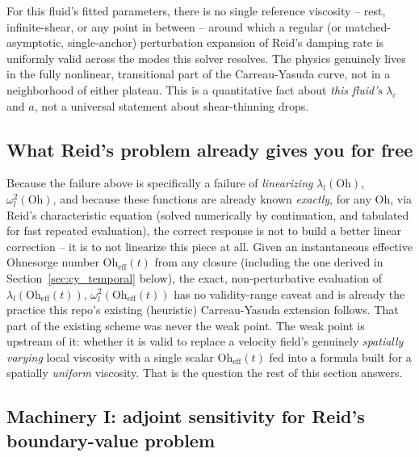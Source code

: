\begin{keybox}
For this fluid's fitted parameters, there is no single reference viscosity
-- rest, infinite-shear, or any point in between -- around which a
regular (or matched-asymptotic, single-anchor) perturbation expansion of
Reid's damping rate is uniformly valid across the modes this solver
resolves. The physics genuinely lives in the fully nonlinear, transitional
part of the Carreau-Yasuda curve, not in a neighborhood of either plateau.
This is a quantitative fact about \emph{this fluid's} $\lambda_c$ and $a$,
not a universal statement about shear-thinning drops.
\end{keybox}

\subsection{What Reid's problem already gives you for free}
\label{sec:cy_exact_evaluation}

Because the failure above is specifically a failure of \emph{linearizing}
$\lambda_l(\mathrm{Oh})$, $\omega_l^2(\mathrm{Oh})$, and because these
functions are already known \emph{exactly}, for any $\mathrm{Oh}$, via
Reid's characteristic equation (solved numerically by continuation, and
tabulated for fast repeated evaluation), the correct response is not to
build a better linear correction -- it is to not linearize this piece at
all. Given an instantaneous effective Ohnesorge number
$\mathrm{Oh}_{\mathrm{eff}}(t)$ from any closure (including the one derived
in Section~\ref{sec:cy_temporal} below), the exact, non-perturbative
evaluation of $\lambda_l(\mathrm{Oh}_{\mathrm{eff}}(t))$,
$\omega_l^2(\mathrm{Oh}_{\mathrm{eff}}(t))$ has no validity-range caveat and
is already the practice this repo's existing (heuristic) Carreau-Yasuda
extension follows. That part of the existing scheme was never the weak
point. The weak point is upstream of it: whether it is valid to replace a
velocity field's genuinely \emph{spatially varying} local viscosity with a
single scalar $\mathrm{Oh}_{\mathrm{eff}}(t)$ fed into a formula built for a
spatially \emph{uniform} viscosity. That is the question the rest of this
section answers.

\subsection{Machinery I: adjoint sensitivity for Reid's boundary-value problem}
\label{sec:cy_adjoint}

